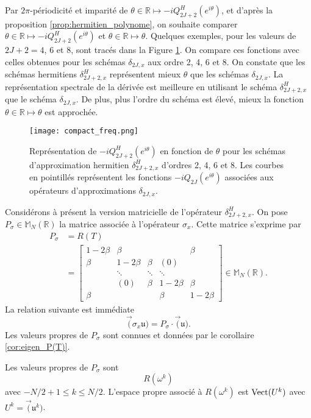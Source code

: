 Par $2 \pi$-périodicité et imparité de $\theta \in \mathbb{R} \mapsto - i Q_{2J+2}^H(e^{i \theta})$, et d'après la proposition \ref{prop:hermitien_polynome}, on souhaite comparer $\theta \in \mathbb{R} \mapsto - i Q_{2J+2}^H(e^{i \theta})$ et $\theta \in \mathbb{R} \mapsto \theta$. Quelques exemples, pour les valeurs de $2J+2 = 4$, $6$ et $8$, sont tracés dans la Figure \ref{fig:freq_herm}. On compare ces fonctions avec celles obtenues pour les schémas $\delta_{2J,x}$ aux ordre 2, 4, 6 et 8. On constate que les schémas hermitiens $\delta_{2J+2,x}^H$ représentent mieux $\theta$ que les schémas $\delta_{2J,x}$. La représentation spectrale de la dérivée est meilleure en utilisant le schéma $\delta_{2J+2,x}^H$ que le schéma $\delta_{2J,x}$. De plus, plus l'ordre du schéma est élevé, mieux la fonction $\theta \in \mathbb{R} \mapsto \theta$ est approchée.

\begin{figure}[htbp]
\begin{center}
\texttt{[image: compact\_freq.png]}
\end{center}
\caption{Représentation de $-i Q_{2J+2}^H \left( e^{i \theta} \right)$ en fonction de $\theta$ pour les schémas d'approximation hermitien $\delta_{2J+2,x}^H$ d'ordres 2, 4, 6 et 8. Les courbes en pointillés représentent les fonctions $-i Q_{2J}\left( e^{i \theta} \right)$ associées aux opérateurs d'approximations $\delta_{2J,x}$.}
\label{fig:freq_herm}
\end{figure}


Considérons à présent la version matricielle de l'opérateur $\delta_{2J+2,x}^H$. On pose $P_{\sigma} \in \mathbb{M}_N(\mathbb{R})$ la matrice associée à l'opérateur $\sigma_x$. Cette matrice s'exprime par
\begin{align}
P_{\sigma} & = R(T) \\
  & = \begin{bmatrix}
  1 - 2 \beta & \beta &   &   & \beta \\ 
  \beta & 1 - 2 \beta & \beta & (0) &   \\ 
    & \ddots & \ddots & \ddots &   \\ 
    & (0) & \beta & 1 - 2 \beta & \beta \\ 
  \beta &   &   & \beta & 1 - 2 \beta
  \end{bmatrix} \in \mathbb{M}_{N}(\mathbb{R}).
\label{eq:matrice_implicitpart}
\end{align}
La relation suivante est immédiate
\begin{equation}
\vec (\sigma_x \mathfrak{u}) = P_{\sigma} \cdot \vec (\mathfrak{u}).
\end{equation}
Les valeurs propres de $P_{\sigma}$ sont connues et données par le corollaire \ref{cor:eigen_P(T)}.
\begin{proposition}
Les valeurs propres de $P_{\sigma}$ sont 
\begin{equation}
R(\omega^k)
\end{equation}
avec $-N/2+1 \leq k \leq N/2$. L'espace propre associé à $R(\omega^k)$ est $\text{Vect}(U^k)$ avec $U^k = \vec( \mathfrak{u}^k )$.
\end{proposition}

